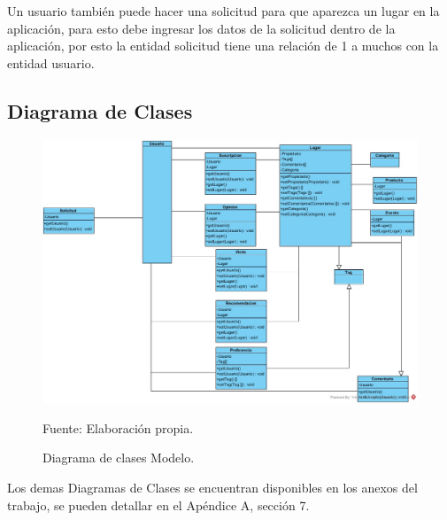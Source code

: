 \documentclass[12pt,letterpaper,openany]{book}
\begin{document}
Un usuario también puede hacer una solicitud para que aparezca un lugar en la aplicación, para esto debe ingresar los datos de la solicitud dentro de la aplicación, por esto la entidad solicitud tiene una relación de 1 a muchos con la entidad usuario.

\subsection{Diagrama de Clases}
\begin{figure}[H]
\begin{center}
\includegraphics[width=17cm]{./imagenes/diagrama_clases_modelo2}
\caption{Diagrama de clases Modelo.}
\centering Fuente: Elaboración propia.
\end{center}
\end{figure}

Los demas Diagramas de Clases se encuentran disponibles en los anexos del trabajo, se pueden detallar en el Apéndice A, sección 7.
\end{document}
